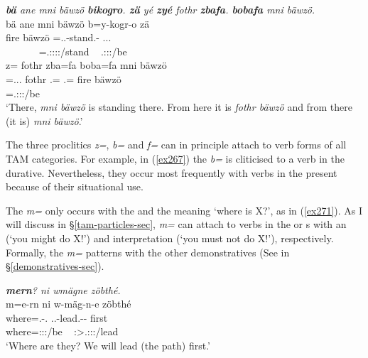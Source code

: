 \begin{exe}
	\ex \emph{\textbf{bä} ane mni bäwzö \textbf{bikogro}. \textbf{zä} yé \textbf{zyé} fothr \textbf{zbafa}. \textbf{bobafa} mni bäwzö.}\\
	\glll bä ane mni bäwzö b=y-kogr-o zä \\
	\Med{} {\Dem} fire bäwzö \Med=\Tsg.\Masc.\Alph-stand.\Ndu-\Andat{} {\Prox} \Tsg.\Masc.\Cop.{\Ndu}\\
	~ ~ ~ ~ {\footnotesize \Med=\Tsg.\Masc:\Sbj:\Nonpast:\Ipfv:\Andat/stand} ~ {\footnotesize \Tsg.\Masc:\Sbj:\Nonpast:\Ipfv/be}\\
	\sn
	\glll  z= fothr zba=fa boba=fa mni bäwzö\\
	\Prox=\Tsg.\Masc.\Cop.{\Ndu} fothr \Prox.\Abl={\Abl} \Med.\Abl={\Abl} fire bäwzö\\
	{\footnotesize \Prox=\Tsg.\Masc:\Sbj:\Nonpast:\Ipfv/be} ~ ~ ~ ~ ~\\
	\trans `There, \emph{mni bäwzö} is standing there. From here it is \emph{fothr bäwzö} and from there (it is) \emph{mni bäwzö}.' 
	\label{ex272}
\end{exe}

The three proclitics \emph{z=}, \emph{b=} and \emph{f=} can in principle attach to verb forms of all TAM categories. For example, in (\ref{ex267}) the  \emph{b=} is cliticised to a verb in the  durative. Nevertheless, they occur most frequently with verbs in the present  because of their situational use.

The  \emph{m=} only occurs with the  and the meaning `where is X?', as in (\ref{ex271}). As I will discuss in {\S}\ref{tam-particles-sec}, \emph{m=} can attach to verbs in the  or  s	 with an  (`you might do X!') and  interpretation (`you must not do X!'), respectively. Formally, the \emph{m=}  patterns with the other demonstratives (See  in {\S}\ref{demonstratives-sec}).

\begin{exe}
	\ex \emph{\textbf{mern}? ni wmägne zöbthé.}\\
	\glll m=e-rn ni w-mäg-n-e zöbthé\\
	where=\Stnsg.\Alph-\Cop.{\Du} {\Fnsg} \Tsg.\F.\Alph-lead.\Ext-\Du-{\Fnsg} first\\
	{\footnotesize where=\Stdu:\Sbj:\Nonpast:\Ipfv/be} ~ {\footnotesize \Fdu:\Sbj>\Tsg.\F:\Obj:\Nonpast:\Ipfv/lead} ~\\
	\trans `Where are they? We will lead (the path) first.' 
	\label{ex271}
\end{exe}